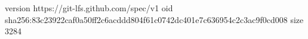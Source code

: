 version https://git-lfs.github.com/spec/v1
oid sha256:83c23922caf0a50ff2c6acddd804f61c0742dc401e7c636954c2c3ac9f0cd008
size 3284
